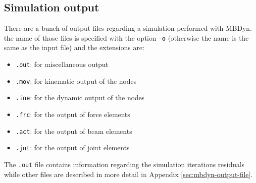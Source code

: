 %


\subsection{Simulation output}
\label{sec:mbd-output}

There are a bunch of output files regarding a simulation performed with MBDyn. the name of those files is specified with the option \texttt{-o} (otherwise the name is the same as the input file) and the extensions are:

\begin{itemize}
    \item \texttt{.out}: for miscellaneous output
    \item \texttt{.mov}: for kinematic output of the nodes
    \item \texttt{.ine}: for the dynamic output of the nodes
    \item \texttt{.frc}: for the output of force elements
    \item \texttt{.act}: for the output of beam elements
    \item \texttt{.jnt}: for the output of joint elements
\end{itemize}

The \texttt{.out} file contains information regarding the simulation iterations residuals while other files are described in more detail in Appendix \ref{sec:mbdyn-output-file}.



%
%
%



